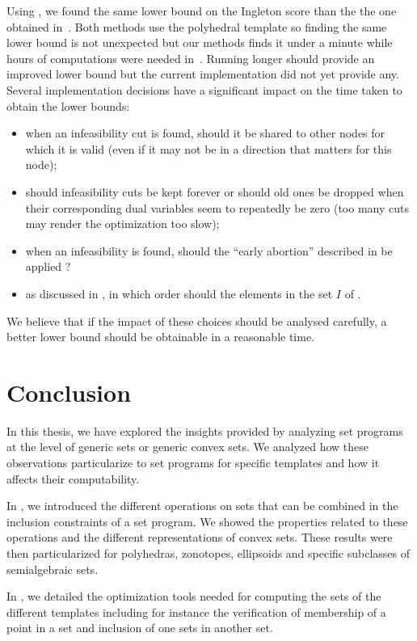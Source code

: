 \documentclass[11pt,twoside,a4paper,openright]{uclouvain-thesis}
\newcommand{\clearemptydoublepage}{%
	\newpage{\pagestyle{empty}\cleardoublepage}}
\begin{document}
Using , we found the same lower bound on the Ingleton score than the
the one obtained in~\cite{dougherty2011non}.
Both methods use the polyhedral template so finding the same lower bound is not unexpected
but our methods finds it under a minute while hours of computations were needed in~\cite{dougherty2011non}.
Running  longer should provide an improved lower bound but
the current implementation did not yet provide any.
Several implementation decisions have a significant impact on the time taken
to obtain the lower bounds:
\begin{itemize}
  \item when an infeasibility cut is found, should it be shared to other nodes for which it is valid (even if it may not be in a direction that matters for this node);
  \item should infeasibility cuts be kept forever or should old ones be dropped when their corresponding dual variables seem to repeatedly be zero (too many cuts may render the optimization too slow);
  \item when an infeasibility is found, should the ``early abortion'' described in  be applied ?
  \item as discussed in , in which order should the elements in the
    set $I$ of .
\end{itemize}
We believe that if the impact of these choices should be analysed carefully,
a better lower bound should be obtainable in a reasonable time.

\clearemptydoublepage

\chapter{Conclusion}\label{chap:ccl}
In this thesis, we have explored the insights provided by analyzing set programs at the level of generic sets or generic convex sets.
We analyzed how these observations particularize to set programs for specific templates and how it affects their computability.

In , we introduced the different operations on sets that can be combined in the inclusion constraints of a set program.
We showed the properties related to these operations and the different representations of convex sets.
These results were then particularized for polyhedras, zonotopes, ellipsoids and specific subclasses of semialgebraic sets.

In , we detailed the optimization tools needed for
computing the sets of the different templates including for instance
the verification of membership of a point in a set and inclusion of
one sets in another set.
\end{document}
